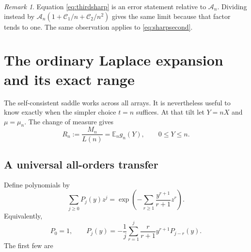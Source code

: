\documentclass[11pt,a4paper]{article}
\numberwithin{equation}{section}
\theoremstyle{definition}\newtheorem{definition}[theorem]{Definition}
\theoremstyle{remark}\newtheorem{remark}[theorem]{Remark}
\newcommand{\E}{\mathbb E}
\newcommand{\Cj}{\mathscr C}
\newcommand{\A}{\mathcal A}
\begin{document}
\begin{remark}
Equation \eqref{eq:thirdsharp} is an error statement relative to $\A_n$. Dividing instead by $\A_n(1+\Cj_1/n+\Cj_2/n^2)$ gives the same limit because that factor tends to one. The same observation applies to \eqref{eq:sharpsecond}.
\end{remark}

\section{The ordinary Laplace expansion and its exact range}
\label{sec:laplace}
The self-consistent saddle works across all arrays. It is nevertheless useful to know exactly when the simpler choice $t=n$ suffices.
At that tilt let $Y=nX$ and $\mu=\mu_n$. The change of measure gives
\begin{equation}\label{eq:originaltilt}
 R_n:=\frac{M_n}{L(n)}=\E_n g_n(Y),\qquad 0\le Y\le n.
\end{equation}

\subsection{A universal all-orders transfer}
Define polynomials by
\begin{equation}\label{eq:Pgenerating}
 \sum_{j\ge0}P_j(y)z^j
 =\exp\!\left(-\sum_{r\ge1}\frac{y^{r+1}}{r+1}z^r\right).
\end{equation}
Equivalently,
\begin{equation}\label{eq:Prec}
 P_0=1,\qquad
 P_j(y)=-\frac1j\sum_{r=1}^j\frac{r}{r+1}y^{r+1}P_{j-r}(y).
\end{equation}
The first few are

\end{document}
